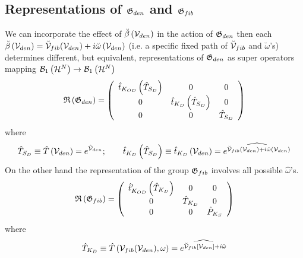 \subsection{Representations of ${\frak G}_{den}$ and ${\frak G}_{fib}$}

We can incorporate the effect of ${\cal \breve{\beta}}\left( {\cal V}%
_{den}\right) $ in the action of ${\frak G}_{den}$ then each ${\cal \breve{%
\beta}}\left( {\cal V}_{den}\right) ={\cal \breve{V}}_{fib}({\cal V}_{den})+i%
\breve{\omega}\left( {\cal V}_{den}\right) $ (i.e. a specific fixed path of $%
{\cal \breve{V}}_{fib}$ and $\breve{\omega}$'s) determines different, but
equivalent, representations of ${\frak G}_{den}$ as super operators mapping $%
{\cal B}_{1}\left( {\cal H}^{N}\right) \rightarrow {\cal B}_{1}\left( {\cal H%
}^{N}\right) $ 
\begin{equation}
{\frak R}\left( {\frak G}_{den}\right) =\left( 
\begin{array}{ccc}
\hat{t}_{K_{OD}}\left( \hat{T}_{S_{D}}\right) & 0 & 0 \\ 
0 & \hat{t}_{K_{D}}\left( \hat{T}_{S_{D}}\right) & 0 \\ 
0 & 0 & \hat{T}_{S_{D}}%
\end{array}%
\right)
\end{equation}%
where%
\begin{equation}
\hat{T}_{S_{D}}\equiv \hat{T}\left( {\cal V}_{den}\right) =e^{{\cal \hat{V}}%
_{den}};\qquad \hat{t}_{K_{D}}\left( \hat{T}_{S_{D}}\right) \equiv \hat{t}%
_{K_{D}}\left( {\cal V}_{den}\right) =\widehat{e^{{\cal \breve{V}}_{fib}(%
{\cal V}_{den})+i\check{\omega}\left( {\cal V}_{den}\right) }}
\end{equation}%
On the other hand the representation of the group ${\frak G}_{fib}$ involves
all possible $\hat{\omega}$'s. 
\begin{equation}
{\frak R}\left( {\frak G}_{fib}\right) =\left( 
\begin{array}{ccc}
\hat{t}_{K_{OD}}^{\prime }\left( \hat{T}_{K_{D}}\right) & 0 & 0 \\ 
0 & \hat{T}_{K_{D}} & 0 \\ 
0 & 0 & \hat{P}_{K_{S}}%
\end{array}%
\right)
\end{equation}%
where%
\begin{equation}
\hat{T}_{K_{D}}\equiv \hat{T}\left( {\cal V}_{fib}({\cal V}_{den}),\omega
\right) =\widehat{e^{{\cal \breve{V}}_{fib}\left[ {\cal V}_{den}\right] +i%
\check{\omega}}}
\end{equation}

